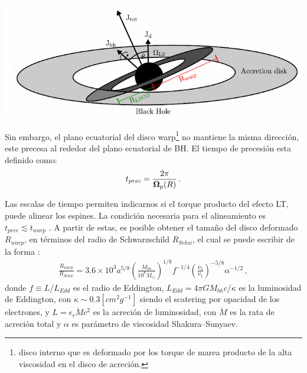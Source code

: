 %
\begin{center}
\includegraphics[scale=.4]{./figures/4_Modelo_Spin/Sistema_con_region_warp.png}
\label{fig: sistema con zona warp}
\end{center}
%
Sin embargo, el plano ecuatorial del disco warp\footnote{disco interno que es deformado por los torque de marea producto de la alta viscosidad en el disco de acreción.} no mantiene la misma dirección, este precesa al rededor del plano ecuatorial de BH. El tiempo de precesión esta definido como:
%
\begin{align}
    t_{prec}= \frac{2\pi}{{\bf{\Omega}}_p(R)}\,.
\end{align}

Las escalas de tiempo permiten indicarnos si el torque producto del efecto LT, puede alinear los espines. La condición necesaria para el alineamiento es $t_{prec}\lesssim t_{warp}$ \cite{natarajan1999}. A partir de estas, es posible obtener el tamaño del disco deformado $R_{warp}$, en términos del radio de Schwarzschild $R_{Schw}$, el cual se puede escribir de la forma \cite{volonteri2007}:
%
\begin{align}
    \frac{R_{warp}}{R_{Schw}}=3.6\times 10^{3}a^{5/8}\left(\frac{M_{bh}}{10^{8}M_{\odot}} \right)^{1/8}f^{-1/4}\left(\frac{\nu_{2}}{\nu_{1}} \right)^{-5/8}\alpha^{-1/2}\,,
\end{align}
%
donde $f\equiv L/L_{Edd}$ es el radio de Eddington, $L_{Edd}=4\pi GM_{bh}c/\kappa$ es  la luminosidad de Eddington, con $\kappa\sim 0.3 [cm^{2}g^{-1}]$ siendo el scatering por opacidad de los electrones, y $L=\epsilon_{r}\dot{M}c^{2}$ es la acreción de luminosidad, con $\dot{M}$ es la rata de acreción total y $\alpha$ es parámetro de viscosidad Shakura–Sunyaev.

